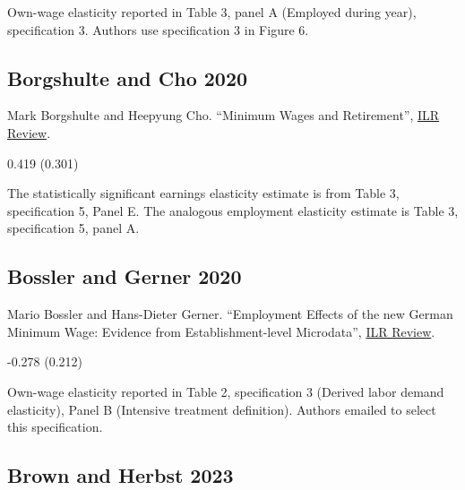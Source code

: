 \vspace{0.7em}

 Own-wage elasticity reported in Table 3, panel A (Employed during year), specification 3. Authors use specification 3 in Figure 6.

\subsection*{Borgshulte and Cho 2020}
\vspace{-0.7em}

\noindent Mark Borgshulte and Heepyung Cho. ``Minimum Wages and Retirement'', \href{https://doi.org/10.1177/0019793919845861}{ILR Review}.

\vspace{0.7em}

 0.419 (0.301)

\vspace{0.7em}

 The statistically significant earnings elasticity estimate is from Table 3, specification 5, Panel E. The analogous employment elasticity estimate is Table 3, specification 5, panel A.

\subsection*{Bossler and Gerner 2020}
\vspace{-0.7em}

\noindent Mario Bossler and Hans-Dieter Gerner. ``Employment Effects of the new German Minimum Wage: Evidence from Establishment-level Microdata'', \href{https://doi.org/10.1177/0019793919889635}{ILR Review}.

\vspace{0.7em}

 -0.278 (0.212)

\vspace{0.7em}

 Own-wage elasticity reported in Table 2, specification 3 (Derived labor demand elasticity), Panel B (Intensive treatment definition). Authors emailed to select this specification.

\subsection*{Brown and Herbst 2023}
\vspace{-0.7em}

